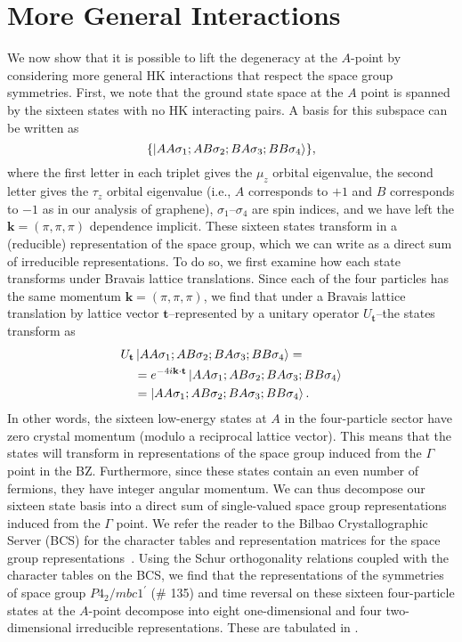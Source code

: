 \documentclass[prb,aps,amssymb,twocolumn,notitlepage]{revtex4-2}
\begin{document}
\section{More General Interactions}
\label{sec:General Interactions}
 We now show that it is possible to lift the degeneracy at the $A$-point by considering more general HK interactions that respect the space group symmetries. 
 First, we note that the ground state space at the $A$ point is spanned by the sixteen states with no HK interacting pairs. 
 A basis for this subspace can be written as
 \begin{equation}
 \{\ket{AA\sigma_1;AB\sigma_2;BA\sigma_3;BB\sigma_4}\},
 \end{equation} 
where the first letter in each triplet gives the $\mu_z$ orbital eigenvalue, the second letter gives the $\tau_z$ orbital eigenvalue (i.e., $A$ corresponds to $+1$ and $B$ corresponds to $-1$ as in our analysis of graphene), $\sigma_1$--$\sigma_4$ are spin indices, and we have left the $\mathbf{k}=(\pi,\pi,\pi)$ dependence implicit.
These sixteen states transform in a (reducible) representation of the space group, which we can write as a direct sum of irreducible representations. 
To do so, we first examine how each state transforms under Bravais lattice translations. 
Since each of the four particles has the same momentum $\mathbf{k}=(\pi,\pi,\pi)$, we find that under a Bravais lattice translation by lattice vector $\mathbf{t}$--represented by a unitary operator $U_\mathbf{t}$--the states transform as
\begin{align}
U_\mathbf{t}&\ket{AA\sigma_1;AB\sigma_2;BA\sigma_3;BB\sigma_4}= \nonumber \\ 
& =e^{-4i\mathbf{k}\cdot\mathbf{t}}\ket{AA\sigma_1;AB\sigma_2;BA\sigma_3;BB\sigma_4} \nonumber \\
& = \ket{AA\sigma_1;AB\sigma_2;BA\sigma_3;BB\sigma_4}.
\end{align}
In other words, the sixteen low-energy states at $A$ in the four-particle sector have zero crystal momentum (modulo a reciprocal lattice vector). 
This means that the states will transform in representations of the space group induced from the $\Gamma$ point in the BZ. 
Furthermore, since these states contain an even number of fermions, they have integer angular momentum. 
We can thus decompose our sixteen state basis into a direct sum of single-valued space group representations induced from the $\Gamma$ point. 
We refer the reader to the Bilbao Crystallographic Server (BCS) for the character tables and representation matrices for the space group representations~\cite{aroyo2006bilbaoa,aroyo2006bilbao,aroyo2011crystallography,elcoro2017double}. 
Using the Schur orthogonality relations coupled with the character tables on the BCS, we find that the representations of the symmetries of space group $P4_2/mbc1^\prime$ (\# 135) and time reversal on these sixteen four-particle states at the $A$-point decompose into eight one-dimensional and four two-dimensional irreducible representations.
These are tabulated in .
\end{document}
